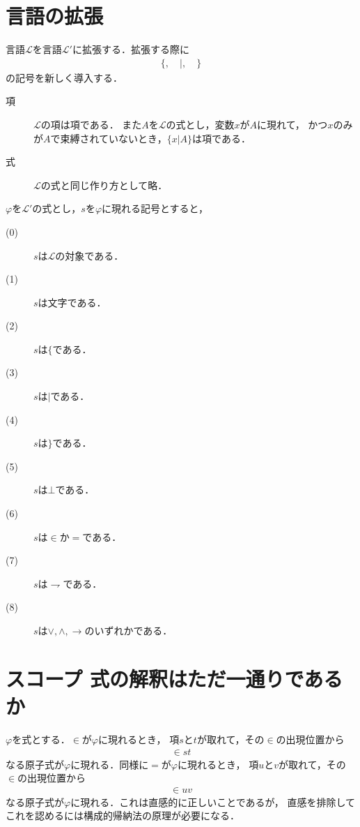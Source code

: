 \documentclass[a4j,10.5pt,oneside,openany]{jsbook}
\begin{document}
\section{言語の拡張}
	言語$\mathcal{L}$を言語$\mathcal{L}'$に拡張する．拡張する際に
	\begin{align}
		\{, \quad |, \quad \}
	\end{align}
	の記号を新しく導入する．
	
	\begin{description}
		\item[項] $\mathcal{L}$の項は項である．
			また$A$を$\mathcal{L}$の式とし，変数$x$が$A$に現れて，
			かつ$x$のみが$A$で束縛されていないとき，$\{x|A\}$は項である．
		
		\item[式] $\mathcal{L}$の式と同じ作り方として略．
	\end{description}
	
	$\varphi$を$\mathcal{L}'$の式とし，$s$を$\varphi$に現れる記号とすると，
	\begin{description}
		\item[(0)] $s$は$\mathcal{L}$の対象である．
		\item[(1)] $s$は文字である．
		\item[(2)] $s$は$\{$である．
		\item[(3)] $s$は$|$である．
		\item[(4)] $s$は$\}$である．
		\item[(5)] $s$は$\bot$である．
		\item[(6)] $s$は$\in$か$=$である．
		\item[(7)] $s$は$\rightharpoondown$である．
		\item[(8)] $s$は$\vee,\wedge,\rightarrow$のいずれかである．
	\end{description}
	
\section{スコープ 式の解釈はただ一通りであるか}
	$\varphi$を式とする．$\in$が$\varphi$に現れるとき，
	項$s$と$t$が取れて，その$\in$の出現位置から
	\begin{align}
		\in st
	\end{align}
	なる原子式が$\varphi$に現れる．同様に$=$が$\varphi$に現れるとき，
	項$u$と$v$が取れて，その$\in$の出現位置から
	\begin{align}
		\in uv
	\end{align}
	なる原子式が$\varphi$に現れる．これは直感的に正しいことであるが，
	直感を排除してこれを認めるには構成的帰納法の原理が必要になる．
	
\end{document}
